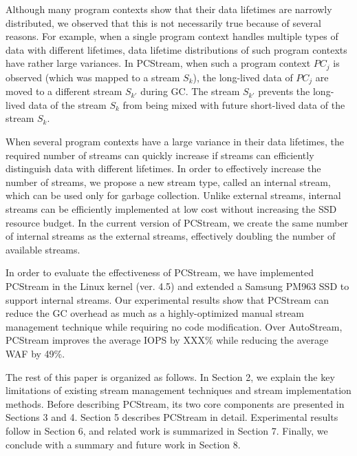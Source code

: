Although many program contexts show that their data lifetimes are 
narrowly distributed, we observed that 
this is not necessarily true because of several reasons.  
For example, when a single program context handles multiple types of data with 
different lifetimes, data lifetime distributions of such
program contexts  
have rather large variances.
In \textsf{\small PCStream}, 
when such a program context {\it $PC_j$} is observed 
(which was mapped to a stream {\it $S_k$}), 
the long-lived data of {\it $PC_j$} are moved to a different stream {\it $S_{k'}$}
during GC.  
The stream {\it $S_{k'}$} prevents the long-lived data of the stream {\it $S_k$} 
from being mixed with future short-lived data of the stream {\it $S_k$}.

When several program contexts have a large variance in their data lifetimes, 
the required number of streams can quickly increase if streams can efficiently 
distinguish data with different lifetimes.
In order to effectively increase the number of streams, we propose a new stream type, 
called an internal stream, which can be used only for garbage collection.
Unlike external streams, internal streams can be efficiently
implemented at low cost without increasing the SSD resource budget.  
In the current version of \textsf{\small PCStream}, we create the same number of internal streams 
as the external streams, effectively doubling the number of available streams. 

In order to evaluate the effectiveness of \textsf{\small PCStream}, 
we have implemented \textsf{\small PCStream}
in the Linux kernel (ver. 4.5) and 
extended a Samsung PM963 SSD to support internal streams.
Our experimental results show that \textsf{\small PCStream}
can reduce the GC overhead as much as a highly-optimized 
manual stream management technique while requiring no code modification.  
Over \textsf{\small AutoStream}, \textsf{\small PCStream} improves the average IOPS
by XXX\% while reducing the average WAF by 49\%.

The rest of this paper is organized as follows. 
In Section 2, we explain the key limitations of 
existing stream management techniques and stream implementation methods.
Before describing \textsf{\small PCStream}, its two core components are 
presented in Sections 3 and 4.
Section 5 describes \textsf{\small PCStream} in detail.
Experimental results follow in Section 6,
and related work is summarized in Section 7.  
Finally, we conclude with a summary and future work in Section 8.

